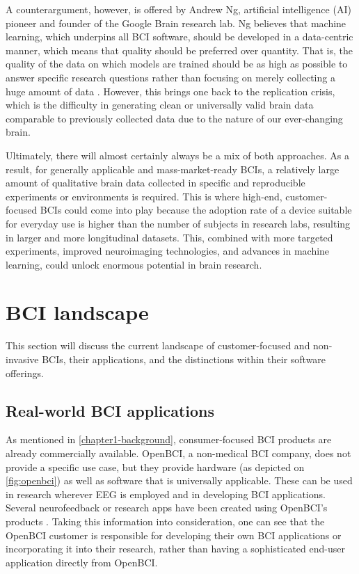 A counterargument, however, is offered by Andrew Ng, artificial intelligence (AI) pioneer and founder of the Google Brain research lab. Ng believes that machine learning, which underpins all BCI software, should be developed in a data-centric manner, which means that quality should be preferred over quantity. That is, the quality of the data on which models are trained should be as high as possible to answer specific research questions rather than focusing on merely collecting a huge amount of data \citep{brown_why_2022}. However, this brings one back to the replication crisis, which is the difficulty in generating clean or universally valid brain data comparable to previously collected data due to the nature of our ever-changing brain.

Ultimately, there will almost certainly always be a mix of both approaches. As a result, for generally applicable and mass-market-ready BCIs, a relatively large amount of qualitative brain data collected in specific and reproducible experiments or environments is required. This is where high-end, customer-focused BCIs could come into play because the adoption rate of a device suitable for everyday use is higher than the number of subjects in research labs, resulting in larger and more longitudinal datasets. This, combined with more targeted experiments, improved neuroimaging technologies, and advances in machine learning, could unlock enormous potential in brain research.

\section{BCI landscape}
\label{chapter2-research-landscape}

This section will discuss the current landscape of customer-focused and non-invasive BCIs, their applications, and the distinctions within their software offerings.

\subsection{Real-world BCI applications}
\label{chapter2-real-world-bci-applications}

As mentioned in \autoref{chapter1-background}, consumer-focused BCI products are already commercially available. OpenBCI, a non-medical BCI company, does not provide a specific use case, but they provide hardware (as depicted on \autoref{fig:openbci}) as well as software that is universally applicable. These can be used in research wherever EEG is employed and in developing BCI applications. Several neurofeedback or research apps have been created using OpenBCI’s products \citep{openbci_openbci_nodate}. Taking this information into consideration, one can see that the OpenBCI customer is responsible for developing their own BCI applications or incorporating it into their research, rather than having a sophisticated end-user application directly from OpenBCI.

